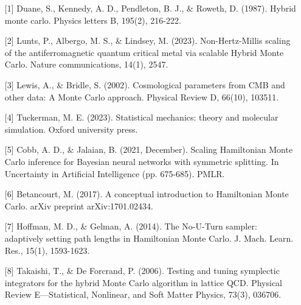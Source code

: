 \begin{talk}
\begin{enumerate}
\item[{[1]}] Duane, S., Kennedy, A. D., Pendleton, B. J., \& Roweth, D. (1987). Hybrid monte carlo. Physics letters B, 195(2), 216-222.
\item[{[2]}] Lunts, P., Albergo, M. S., \& Lindsey, M. (2023). Non-Hertz-Millis scaling of the antiferromagnetic quantum critical metal via scalable Hybrid Monte Carlo. Nature communications, 14(1), 2547.
\item[{[3]}] Lewis, A., \& Bridle, S. (2002). Cosmological parameters from CMB and other data: A Monte Carlo approach. Physical Review D, 66(10), 103511.
\item[{[4]}] Tuckerman, M. E. (2023). Statistical mechanics: theory and molecular simulation. Oxford university press.
\item[{[5]}] Cobb, A. D., \& Jalaian, B. (2021, December). Scaling Hamiltonian Monte Carlo inference for Bayesian neural networks with symmetric splitting. In Uncertainty in Artificial Intelligence (pp. 675-685). PMLR.
\item[{[6]}] Betancourt, M. (2017). A conceptual introduction to Hamiltonian Monte Carlo. arXiv preprint arXiv:1701.02434.
\item[{[7]}] Hoffman, M. D., \& Gelman, A. (2014). The No-U-Turn sampler: adaptively setting path lengths in Hamiltonian Monte Carlo. J. Mach. Learn. Res., 15(1), 1593-1623.
\item[{[8]}] Takaishi, T., \& De Forcrand, P. (2006). Testing and tuning symplectic integrators for the hybrid Monte Carlo algorithm in lattice QCD. Physical Review E—Statistical, Nonlinear, and Soft Matter Physics, 73(3), 036706.
\end{enumerate}


\end{talk}
